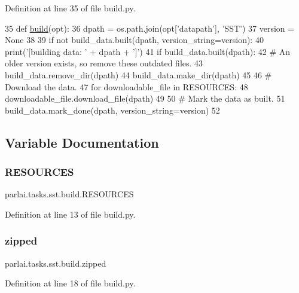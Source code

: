 Definition at line 35 of file build.\+py.


\begin{DoxyCode}
35 \textcolor{keyword}{def }\hyperlink{namespacedialog__babi__feedback_1_1build_a7a9d289f7493a5ded13c4b7f071b6184}{build}(opt):
36     dpath = os.path.join(opt[\textcolor{stringliteral}{'datapath'}], \textcolor{stringliteral}{'SST'})
37     version = \textcolor{keywordtype}{None}
38 
39     \textcolor{keywordflow}{if} \textcolor{keywordflow}{not} build\_data.built(dpath, version\_string=version):
40         print(\textcolor{stringliteral}{'[building data: '} + dpath + \textcolor{stringliteral}{']'})
41         \textcolor{keywordflow}{if} build\_data.built(dpath):
42             \textcolor{comment}{# An older version exists, so remove these outdated files.}
43             build\_data.remove\_dir(dpath)
44         build\_data.make\_dir(dpath)
45 
46         \textcolor{comment}{# Download the data.}
47         \textcolor{keywordflow}{for} downloadable\_file \textcolor{keywordflow}{in} RESOURCES:
48             downloadable\_file.download\_file(dpath)
49 
50         \textcolor{comment}{# Mark the data as built.}
51         build\_data.mark\_done(dpath, version\_string=version)
52 \end{DoxyCode}


\subsection{Variable Documentation}
\mbox{\label{namespaceparlai_1_1tasks_1_1sst_1_1build_a2dd5a09775085687309bdec21b8cf7ad}} 
\subsubsection{\texorpdfstring{R\+E\+S\+O\+U\+R\+C\+ES}{RESOURCES}}
{\footnotesize\ttfamily parlai.\+tasks.\+sst.\+build.\+R\+E\+S\+O\+U\+R\+C\+ES}



Definition at line 13 of file build.\+py.

\mbox{\label{namespaceparlai_1_1tasks_1_1sst_1_1build_a2ef5f9953913e688ccfc417598b46892}} 
\subsubsection{\texorpdfstring{zipped}{zipped}}
{\footnotesize\ttfamily parlai.\+tasks.\+sst.\+build.\+zipped}



Definition at line 18 of file build.\+py.

